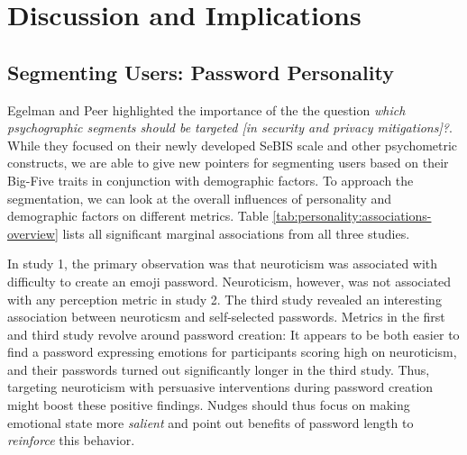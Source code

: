 






\section{Discussion and Implications}


\subsection{Segmenting Users: Password Personality}
Egelman and Peer highlighted the importance of the the question \textit{which psychographic segments should be targeted [in security and privacy mitigations]?}. While they focused on their newly developed SeBIS scale and other psychometric constructs, we are able to give new pointers for segmenting users based on their Big-Five traits in conjunction with demographic factors. To approach the segmentation, we can look at the overall influences of personality and demographic factors on different metrics. Table \ref{tab:personality:associations-overview} lists all significant marginal associations from all three studies. 

In study 1, the primary observation was that neuroticism was associated with difficulty to create an emoji password. Neuroticism, however, was not associated with any perception metric in study 2. The third study revealed an interesting association between neuroticsm and self-selected passwords. Metrics in the first and third study revolve around password creation: It appears to be both easier to find a password expressing emotions for participants scoring high on neuroticism, and their passwords turned out significantly longer in the third study. Thus, targeting neuroticism with persuasive interventions during password creation might boost these positive findings. Nudges should thus focus on making emotional state more \textit{salient} and point out benefits of password length to \textit{reinforce} this behavior. 

